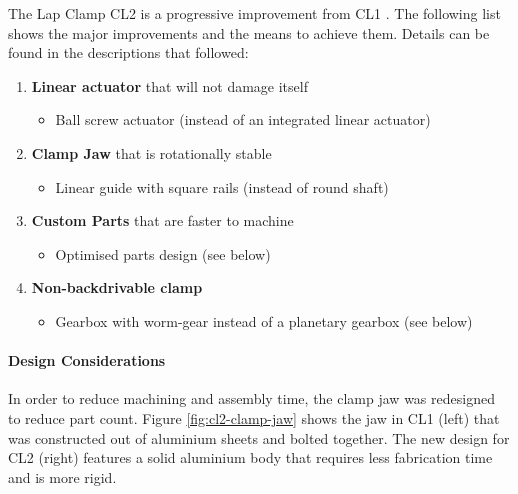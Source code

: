 The Lap Clamp CL2 is a progressive improvement from CL1 . The following list shows the major improvements and the means to achieve them. Details can be found in the descriptions that followed:

\begin{enumerate}[nosep]
\item \textbf{Linear actuator} that will not damage itself
    \begin{itemize}
        \item Ball screw actuator (instead of an integrated linear actuator) 
    \end{itemize}
    \item \textbf{Clamp Jaw} that is rotationally stable 
    \begin{itemize}
        \item Linear guide with square rails (instead of round shaft) 
    \end{itemize}
    \item \textbf{Custom Parts} that are faster to machine
    \begin{itemize}
        \item Optimised parts design (see below)
    \end{itemize}
    \item \textbf{Non-backdrivable clamp}
    \begin{itemize}
        \item Gearbox with worm-gear instead of a planetary gearbox (see below)
    \end{itemize}
\end{enumerate}

\paragraph{Design Considerations}

In order to reduce machining and assembly time, the clamp jaw was redesigned to reduce part count. Figure \ref{fig:cl2-clamp-jaw} shows the jaw in CL1 (left) that was constructed out of aluminium sheets and bolted together. The new design for CL2 (right) features a solid aluminium body that requires less fabrication time and is more rigid. 

